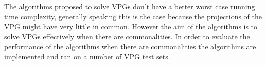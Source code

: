 The algorithms proposed to solve VPGs don't have a better worst case running time complexity, generally speaking this is the case because the projections of the VPG might have very little in common. However the aim of the algorithms is to solve VPGs effectively when there are commonalities. In order to evaluate the performance of the algorithms when there are commonalities the algorithms are implemented and ran on a number of VPG test sets.